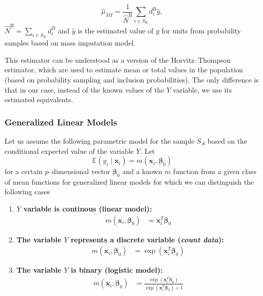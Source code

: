 \documentclass[
]{jss}
\begin{document}
\begin{equation}
\hat{\mu}_{M I}=\frac{1}{\hat{N}^{\mathrm{B}}} \sum_{i \in S_{\mathrm{B}}} d_i^{\mathrm{B}} \hat{y}, 
\end{equation} \(\hat{N}^{\mathrm{B}} = \sum_{i \in S_B} d_i^B\) and
\(\hat{y}\) is the estimated value of \(y\) for units from probability
samples based on mass imputation model.

This estimator can be understood as a version of the Horvitz--Thompson
estimator, which are used to estimate mean or total values in the
population (based on probability sampling and inclusion probabilities).
The only difference is that in our case, instead of the known values of
the \(Y\) variable, we use its estimated equivalents.

\subsubsection{Generalized Linear
Models}\label{generalized-linear-models}

Let us assume the following parametric model for the sample \(S_A\)
based on the conditional expected value of the variable \(Y\). Let
\begin{equation}
\mathbb{E}\left(y_i \mid \boldsymbol{x}_i\right)=m\left(\boldsymbol{x}_i, \boldsymbol{\beta}_0\right)
\end{equation} for a certain \(p\)--dimensional vector
\(\boldsymbol{\beta}_0\) and a known \(m\) function from a given class
of mean functions for generalized linear models for which we can
distinguish the following cases

\begin{enumerate}
    \item \textbf{\( Y \) variable is continous (linear model):}
    \begin{align*}
        m\left(\boldsymbol{x}_i, \boldsymbol{\beta}_0\right) &= \boldsymbol{x}_i^T \boldsymbol{\beta}_0
    \end{align*}

    \item \textbf{The variable \( Y \)  represents a discrete variable (\textit{count data}):}
    \begin{align*}
        m\left(\boldsymbol{x}_i, \boldsymbol{\beta}_0\right) &= \exp \left(\boldsymbol{x}_i^T \boldsymbol{\beta}_0\right)
    \end{align*}

    \item \textbf{The variable \( Y \)  is binary (logistic model):}
    \begin{align*}
        m\left(\boldsymbol{x}_i, \boldsymbol{\beta}_0\right) &= \frac{\exp \left(\boldsymbol{x}_i^T \boldsymbol{\beta}_0\right)}{\exp \left(\boldsymbol{x}_i^T \boldsymbol{\beta}_0\right) + 1}
    \end{align*}
\end{enumerate}
\end{document}
